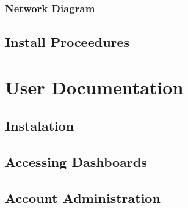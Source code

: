 \documentclass[
    a4paper,
    12pt,
    headings=normal
]{scrreprt}
\begin{document}
            \subsubsection{Network Diagram}

        \newpage
        \subsection{Install Proceedures}
    
    \newpage
    \section{User Documentation}
        \subsection{Instalation}
        \subsection{Accessing Dashboards}
        \subsection{Account Administration}

    \newpage
    \printbibliography

    
\end{document}
